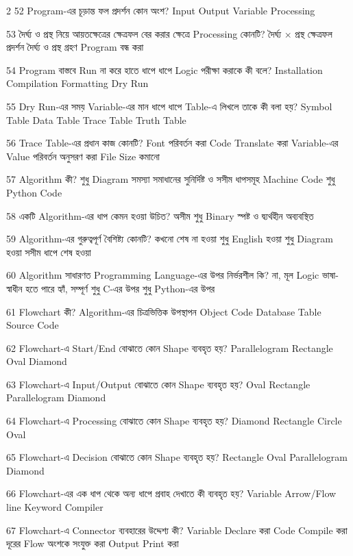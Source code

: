 \begin{multicols}{2}
\mcq
{52}
{Program-এর চূড়ান্ত ফল প্রদর্শন কোন অংশ?}
{Input}
{Output}
{Variable}
{Processing}

\mcq
{53}
{দৈর্ঘ্য ও প্রস্থ নিয়ে আয়তক্ষেত্রের ক্ষেত্রফল বের করার ক্ষেত্রে Processing কোনটি?}
{দৈর্ঘ্য × প্রস্থ}
{ক্ষেত্রফল প্রদর্শন}
{দৈর্ঘ্য ও প্রস্থ গ্রহণ}
{Program বন্ধ করা}

\mcq
{54}
{Program বাস্তবে Run না করে হাতে ধাপে ধাপে Logic পরীক্ষা করাকে কী বলে?}
{Installation}
{Compilation}
{Formatting}
{Dry Run}

\mcq
{55}
{Dry Run-এর সময় Variable-এর মান ধাপে ধাপে Table-এ লিখলে তাকে কী বলা হয়?}
{Symbol Table}
{Data Table}
{Trace Table}
{Truth Table}

\mcqwide
{56}
{Trace Table-এর প্রধান কাজ কোনটি?}
{Font পরিবর্তন করা}
{Code Translate করা}
{Variable-এর Value পরিবর্তন অনুসরণ করা}
{File Size কমানো}

\mcqwide
{57}
{Algorithm কী?}
{শুধু Diagram}
{সমস্যা সমাধানের সুনির্দিষ্ট ও সসীম ধাপসমূহ}
{Machine Code}
{শুধু Python Code}

\mcq
{58}
{একটি Algorithm-এর ধাপ কেমন হওয়া উচিত?}
{অসীম}
{শুধু Binary}
{স্পষ্ট ও দ্ব্যর্থহীন}
{অব্যবস্থিত}

\mcq
{59}
{Algorithm-এর গুরুত্বপূর্ণ বৈশিষ্ট্য কোনটি?}
{কখনো শেষ না হওয়া}
{শুধু English হওয়া}
{শুধু Diagram হওয়া}
{সসীম ধাপে শেষ হওয়া}

\mcqwide
{60}
{Algorithm সাধারণত Programming Language-এর উপর নির্ভরশীল কি?}
{না, মূল Logic ভাষা-স্বাধীন হতে পারে}
{হ্যাঁ, সম্পূর্ণ}
{শুধু C-এর উপর}
{শুধু Python-এর উপর}

\mcqwide
{61}
{Flowchart কী?}
{Algorithm-এর চিত্রভিত্তিক উপস্থাপন}
{Object Code}
{Database Table}
{Source Code}

\mcq
{62}
{Flowchart-এ Start/End বোঝাতে কোন Shape ব্যবহৃত হয়?}
{Parallelogram}
{Rectangle}
{Oval}
{Diamond}

\mcq
{63}
{Flowchart-এ Input/Output বোঝাতে কোন Shape ব্যবহৃত হয়?}
{Oval}
{Rectangle}
{Parallelogram}
{Diamond}

\mcq
{64}
{Flowchart-এ Processing বোঝাতে কোন Shape ব্যবহৃত হয়?}
{Diamond}
{Rectangle}
{Circle}
{Oval}

\mcq
{65}
{Flowchart-এ Decision বোঝাতে কোন Shape ব্যবহৃত হয়?}
{Rectangle}
{Oval}
{Parallelogram}
{Diamond}

\mcq
{66}
{Flowchart-এর এক ধাপ থেকে অন্য ধাপে প্রবাহ দেখাতে কী ব্যবহৃত হয়?}
{Variable}
{Arrow/Flow line}
{Keyword}
{Compiler}

\mcqwide
{67}
{Flowchart-এ Connector ব্যবহারের উদ্দেশ্য কী?}
{Variable Declare করা}
{Code Compile করা}
{দূরের Flow অংশকে সংযুক্ত করা}
{Output Print করা}


\end{multicols}
